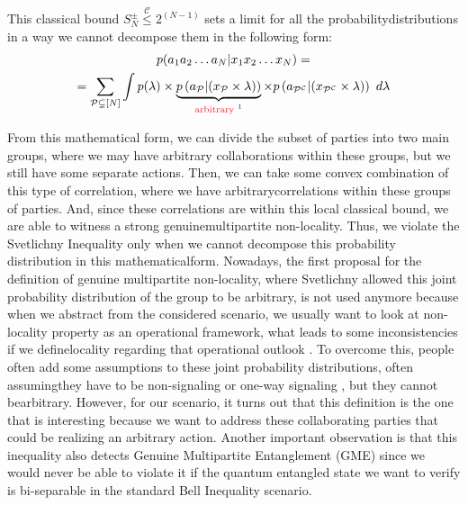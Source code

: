 \documentclass[12pt]{article}
\begin{document}
    \noindent This classical bound ${S}_{N}^{\pm} \stackrel{\mathcal{C}}{\leq} {2}^{(N - 1)}$ sets a limit for all the probability\break distributions in a way we cannot decompose them in the following form:
    \begin{equation*}
        \begin{gathered}
            p({a}_{1} {a}_{2} \dots {a}_{N} | {x}_{1} {x}_{2} \dots {x}_{N}) = \\
            = \sum_{\mathcal{P} \subsetneq [N]} \int p(\lambda) \times \underbrace{p\left({a}_{\mathcal{P}} | ({x}_{\mathcal{P}} \times \lambda)\right)}_{\mathrm{\text{\color{Red} arbitrary \color{Black} \footnotemark}}} \times p\left({a}_{{\mathcal{P}}^{\mathcal{C}}} | ({x}_{{\mathcal{P}}^{\mathcal{C}}} \times \lambda)\right)\ d\lambda
        \end{gathered}
    \end{equation*}
    
    \noindent From this mathematical form, we can divide the subset of parties into two main groups, where we may have arbitrary collaborations within these groups, but we still have some separate actions. Then, we can take some convex combination of this type of correlation, where we have arbitrary\break correlations within these groups of parties. And, since these correlations are within this local classical bound, we are able to witness a strong genuine\break multipartite non-locality. Thus, we violate the Svetlichny Inequality only when we cannot decompose this probability distribution in this mathematical\break form. Nowadays, the first proposal for the definition of genuine multipartite non-locality, where Svetlichny allowed this joint probability distribution of the group to be arbitrary, is not used anymore because when we abstract from the considered scenario, we usually want to look at non-locality property as an operational framework, what leads to some inconsistencies if we define\break locality regarding that operational outlook \cite{gallego-wurflinger-acin-navascues:operational-framework-nonlocality:2012:02-2024}. To overcome this, people often add some assumptions to these joint probability distributions, often assuming\break they have to be non-signaling or one-way signaling \cite{gallego-wurflinger-acin-navascues:operational-framework-nonlocality:2012:02-2024,bancal-barrett-gisin-pironio:definitions-multipartite-nonlocality:2013:02-2024}, but they cannot be\break arbitrary. However, for our scenario, it turns out that this definition is the one that is interesting because we want to address these collaborating parties that could be realizing an arbitrary action. Another important observation is that this inequality also detects Genuine Multipartite Entanglement (GME) since we would never be able to violate it if the quantum entangled state we want to verify is bi-separable in the standard Bell Inequality scenario.
\end{document}
